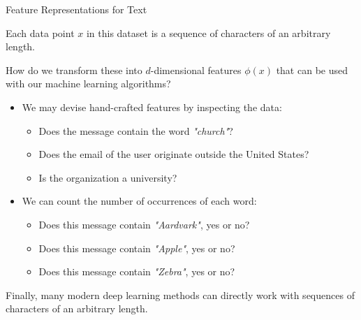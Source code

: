 \documentclass[../../generative_classifiers.tex]{subfiles}
\begin{document}
\begin{frame}[fragile]{Feature Representations for Text}


Each data point $x$ in this dataset is a sequence of characters of an arbitrary length.
\vspace{0.2cm}

How do we transform these into $d$-dimensional features $\phi(x)$ that can be used with our machine learning algorithms?
\vspace{0.2cm}


\begin{itemize}
    \item We may devise hand-crafted features by inspecting the data:
    \begin{itemize}
        \item Does the message contain the word \textit{"church"}?
        \item Does the email of the user originate outside the United States?
        \item Is the organization a university?
    \end{itemize}
    \item We can count the number of occurrences of each word:
    \begin{itemize}
        \item Does this message contain \textit{"Aardvark"}, yes or no?
        \item Does this message contain \textit{"Apple"}, yes or no?
        \item Does this message contain \textit{"Zebra"}, yes or no?
    \end{itemize}
\end{itemize}

Finally, many modern deep learning methods can directly work with sequences of characters of an arbitrary length.


\end{frame}
\end{document}

